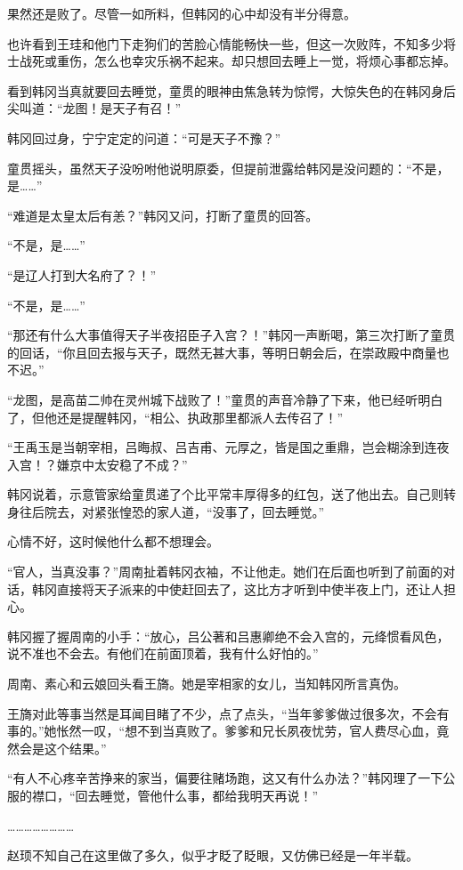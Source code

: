 果然还是败了。尽管一如所料，但韩冈的心中却没有半分得意。

也许看到王珪和他门下走狗们的苦脸心情能畅快一些，但这一次败阵，不知多少将士战死或重伤，怎么也幸灾乐祸不起来。却只想回去睡上一觉，将烦心事都忘掉。

看到韩冈当真就要回去睡觉，童贯的眼神由焦急转为惊愕，大惊失色的在韩冈身后尖叫道：“龙图！是天子有召！”

韩冈回过身，宁宁定定的问道：“可是天子不豫？”

童贯摇头，虽然天子没吩咐他说明原委，但提前泄露给韩冈是没问题的：“不是，是……”

“难道是太皇太后有恙？”韩冈又问，打断了童贯的回答。

“不是，是……”

“是辽人打到大名府了？！”

“不是，是……”

“那还有什么大事值得天子半夜招臣子入宫？！”韩冈一声断喝，第三次打断了童贯的回话，“你且回去报与天子，既然无甚大事，等明日朝会后，在崇政殿中商量也不迟。”

“龙图，是高苗二帅在灵州城下战败了！”童贯的声音冷静了下来，他已经听明白了，但他还是提醒韩冈，“相公、执政那里都派人去传召了！”

“王禹玉是当朝宰相，吕晦叔、吕吉甫、元厚之，皆是国之重鼎，岂会糊涂到连夜入宫！？嫌京中太安稳了不成？”

韩冈说着，示意管家给童贯递了个比平常丰厚得多的红包，送了他出去。自己则转身往后院去，对紧张惶恐的家人道，“没事了，回去睡觉。”

心情不好，这时候他什么都不想理会。

“官人，当真没事？”周南扯着韩冈衣袖，不让他走。她们在后面也听到了前面的对话，韩冈直接将天子派来的中使赶回去了，这比方才听到中使半夜上门，还让人担心。

韩冈握了握周南的小手：“放心，吕公著和吕惠卿绝不会入宫的，元绛惯看风色，说不准也不会去。有他们在前面顶着，我有什么好怕的。”

周南、素心和云娘回头看王旖。她是宰相家的女儿，当知韩冈所言真伪。

王旖对此等事当然是耳闻目睹了不少，点了点头，“当年爹爹做过很多次，不会有事的。”她怅然一叹，“想不到当真败了。爹爹和兄长夙夜忧劳，官人费尽心血，竟然会是这个结果。”

“有人不心疼辛苦挣来的家当，偏要往赌场跑，这又有什么办法？”韩冈理了一下公服的襟口，“回去睡觉，管他什么事，都给我明天再说！”

……………………

赵顼不知自己在这里做了多久，似乎才眨了眨眼，又仿佛已经是一年半载。

